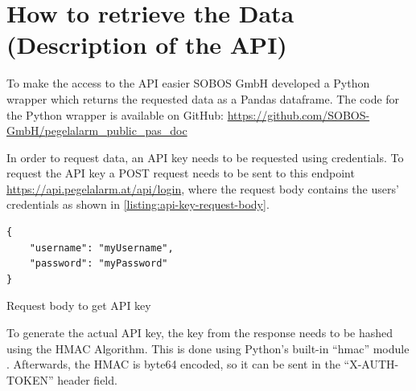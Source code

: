 

\section{How to retrieve the Data (Description of the API)}
To make the access to the API easier SOBOS GmbH developed a Python wrapper which returns the requested data as a Pandas dataframe.\cite{PandasDocumentationPandas} The code for the Python wrapper is available on GitHub\cite{GitHub}: \url{https://github.com/SOBOS-GmbH/pegelalarm_public_pas_doc} \cite{strassmayrPegelalarmAPIWrapper2022}

In order to request data, an API key needs to be requested using credentials. To request the API key a POST request needs to be sent to this endpoint \url{https://api.pegelalarm.at/api/login}, where the request body contains the users' credentials as shown in \autoref{listing:api-key-request-body}. 
\begin{listing}
\begin{verbatim}
{
    "username": "myUsername",
    "password": "myPassword"
}
\end{verbatim}
\caption{Request body to get API key}
\label{listing:api-key-request-body}
\end{listing}
To generate the actual API key, the key from the response needs to be hashed using the \ac{HMAC} Algorithm. This is done using Python's built-in ``hmac'' module \cite{HmacKeyedHashingMessage}. Afterwards, the \ac{HMAC} is byte64 encoded, so it can be sent in the ``X-AUTH-TOKEN'' header field.

